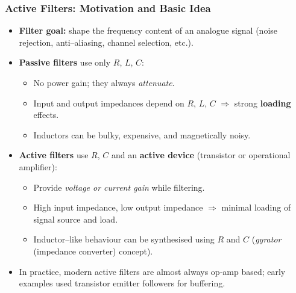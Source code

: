 \begin{frame}
	\frametitle{Active Filters: Motivation and Basic Idea}
	\begin{itemize}
		\item \textbf{Filter goal:} shape the frequency content of an analogue signal
				(noise rejection, anti–aliasing, channel selection, etc.).
		\item \textbf{Passive filters} use only $R$, $L$, $C$:
			\begin{itemize}
				\item No power gain; they always \emph{attenuate}.
				\item Input and output impedances depend on $R$, $L$, $C$ 
						$\Rightarrow$ strong \textbf{loading} effects.
				\item Inductors can be bulky, expensive, and magnetically noisy.
			\end{itemize}
		\item \textbf{Active filters} use $R$, $C$ and an \textbf{active device}
				(transistor or operational amplifier):
			\begin{itemize}
				\item Provide \emph{voltage or current gain} while filtering.
				\item High input impedance, low output impedance
						$\Rightarrow$ minimal loading of signal source and load.
				\item Inductor–like behaviour can be synthesised using $R$ and $C$
						(\emph{gyrator} (impedance converter) concept).
			\end{itemize}
		\item In practice, modern active filters are almost always op‐amp based;
				early examples used transistor emitter followers for buffering.
	\end{itemize}
\end{frame}
